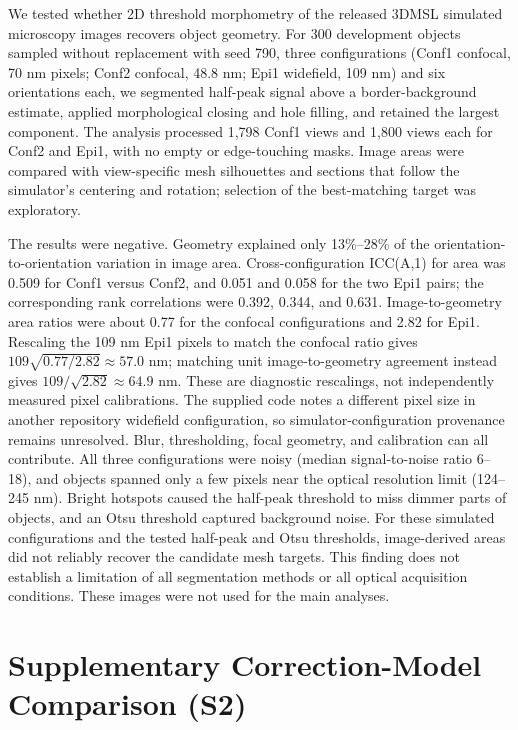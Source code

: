 \documentclass[journal]{IEEEtran}
\begin{document}
We tested whether 2D threshold morphometry of the released 3DMSL simulated microscopy images recovers object geometry. For 300 development objects sampled without replacement with seed 790, three configurations (Conf1 confocal, 70 nm pixels; Conf2 confocal, 48.8 nm; Epi1 widefield, 109 nm) and six orientations each, we segmented half-peak signal above a border-background estimate, applied morphological closing and hole filling, and retained the largest component. The analysis processed 1,798 Conf1 views and 1,800 views each for Conf2 and Epi1, with no empty or edge-touching masks. Image areas were compared with view-specific mesh silhouettes and sections that follow the simulator's centering and rotation; selection of the best-matching target was exploratory.

The results were negative. Geometry explained only 13\%--28\% of the orientation-to-orientation variation in image area. Cross-configuration ICC(A,1) for area was 0.509 for Conf1 versus Conf2, and 0.051 and 0.058 for the two Epi1 pairs; the corresponding rank correlations were 0.392, 0.344, and 0.631. Image-to-geometry area ratios were about 0.77 for the confocal configurations and 2.82 for Epi1. Rescaling the 109 nm Epi1 pixels to match the confocal ratio gives $109\sqrt{0.77/2.82}\approx57.0$ nm; matching unit image-to-geometry agreement instead gives $109/\sqrt{2.82}\approx64.9$ nm. These are diagnostic rescalings, not independently measured pixel calibrations. The supplied code notes a different pixel size in another repository widefield configuration, so simulator-configuration provenance remains unresolved. Blur, thresholding, focal geometry, and calibration can all contribute. All three configurations were noisy (median signal-to-noise ratio 6--18), and objects spanned only a few pixels near the optical resolution limit (124--245 nm). Bright hotspots caused the half-peak threshold to miss dimmer parts of objects, and an Otsu threshold captured background noise. For these simulated configurations and the tested half-peak and Otsu thresholds, image-derived areas did not reliably recover the candidate mesh targets. This finding does not establish a limitation of all segmentation methods or all optical acquisition conditions. These images were not used for the main analyses.

\section{Supplementary Correction-Model Comparison (S2)}
\end{document}
